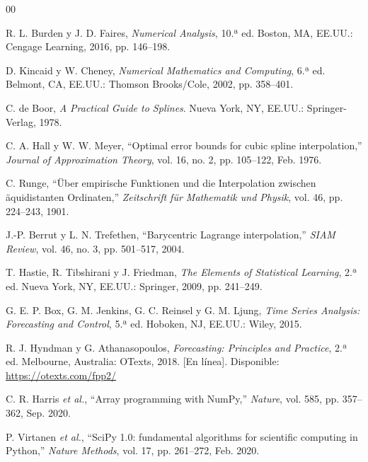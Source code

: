 \documentclass[conference]{IEEEtran}
\begin{document}
\begin{thebibliography}{00}

R. L. Burden y J. D. Faires,
\textit{Numerical Analysis}, 10.ª ed.
Boston, MA, EE.UU.: Cengage Learning, 2016, pp. 146--198.

D. Kincaid y W. Cheney,
\textit{Numerical Mathematics and Computing}, 6.ª ed.
Belmont, CA, EE.UU.: Thomson Brooks/Cole, 2002, pp. 358--401.

C. de Boor,
\textit{A Practical Guide to Splines}.
Nueva York, NY, EE.UU.: Springer-Verlag, 1978.

C. A. Hall y W. W. Meyer,
``Optimal error bounds for cubic spline interpolation,''
\textit{Journal of Approximation Theory},
vol. 16, no. 2, pp. 105--122, Feb. 1976.

C. Runge,
``Über empirische Funktionen und die Interpolation zwischen
äquidistanten Ordinaten,''
\textit{Zeitschrift für Mathematik und Physik},
vol. 46, pp. 224--243, 1901.

J.-P. Berrut y L. N. Trefethen,
``Barycentric Lagrange interpolation,''
\textit{SIAM Review},
vol. 46, no. 3, pp. 501--517, 2004.

T. Hastie, R. Tibshirani y J. Friedman,
\textit{The Elements of Statistical Learning}, 2.ª ed.
Nueva York, NY, EE.UU.: Springer, 2009, pp. 241--249.

G. E. P. Box, G. M. Jenkins, G. C. Reinsel y G. M. Ljung,
\textit{Time Series Analysis: Forecasting and Control}, 5.ª ed.
Hoboken, NJ, EE.UU.: Wiley, 2015.

R. J. Hyndman y G. Athanasopoulos,
\textit{Forecasting: Principles and Practice}, 2.ª ed.
Melbourne, Australia: OTexts, 2018.
[En línea]. Disponible: \url{https://otexts.com/fpp2/}

C. R. Harris \textit{et al.},
``Array programming with NumPy,''
\textit{Nature},
vol. 585, pp. 357--362, Sep. 2020.

P. Virtanen \textit{et al.},
``SciPy 1.0: fundamental algorithms for scientific computing
in Python,''
\textit{Nature Methods},
vol. 17, pp. 261--272, Feb. 2020.


\end{thebibliography}
\end{document}
